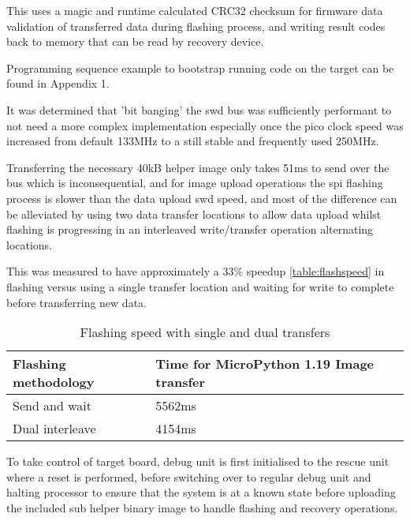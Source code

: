 This uses a \gls{magic} and runtime calculated CRC32 checksum for firmware data validation of transferred data during flashing process, and writing result codes back to memory that can be read by recovery device.

Programming sequence example to bootstrap running code on the target can be found in Appendix 1.

It was determined that 'bit banging' the \gls{swd} bus was sufficiently performant to not need a more complex implementation especially once the pico clock speed was increased from default 133MHz to a still stable and frequently used 250MHz.

Transferring the necessary 40kB helper image only takes 51ms to send over the bus which is inconsequential, and for  image upload operations the \gls{spi} flashing process is slower than the data upload  \gls{swd} speed, and most of the difference can be alleviated by using two data transfer locations to allow data upload whilst flashing is progressing in an interleaved write/transfer operation alternating locations.

This was measured to have approximately a 33\% speedup \autoref{table:flashspeed} in flashing versus using a single transfer location and waiting for write to complete before transferring new data.

\begin{table}[h]
	\centering
	\caption{Flashing speed with single and dual transfers}%
	\vspace{-16.5pt}%
	
	\begin{tabular}{|l|l|}
		\hline
		Flashing methodology & Time for MicroPython 1.19 Image transfer  \\ \hline
		Send and wait & 5562ms \\ \hline
		Dual interleave & 4154ms \\ \hline
	\end{tabular}
	\label{table:flashspeed}
\end{table}

To take control of target board, debug unit is first initialised to the rescue unit where a reset is performed, before switching over to regular debug unit and halting processor to ensure that the system is at a known state before uploading the  included sub helper binary image to handle flashing and recovery operations.

